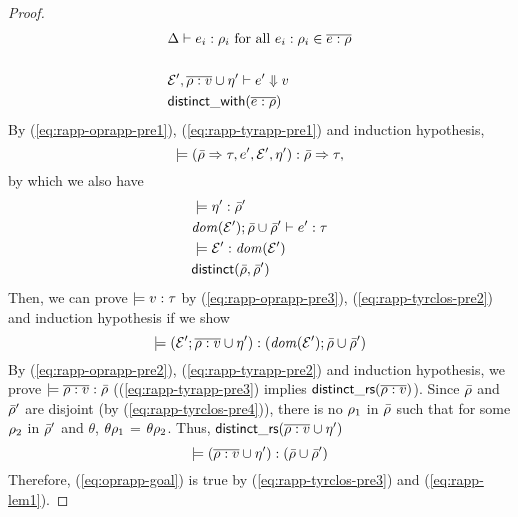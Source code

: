 \begin{proof}
\begin{align}
    \label{eq:rapp-tyrapp-pre2}
    & \Delta \vdash e_i:\rho_i \text{~for all~}
    e_i:\rho_i \in \overline{e:\rho} \\ \nonumber \\
    \label{eq:rapp-oprapp-pre3}
    & \mathcal{E}', \overline{\rho:v} \cup \eta' \vdash e' \Downarrow v \\
    \label{eq:rapp-tyrapp-pre3}
    & {\sf distinct\_with}(\overline{e:\rho})
  \end{align}
  By (\ref{eq:rapp-oprapp-pre1}), (\ref{eq:rapp-tyrapp-pre1}) and induction
  hypothesis,
  \begin{equation*}
    \models (\bar{\rho} \Rightarrow \tau, e', \mathcal{E}', \eta'):\bar{\rho} \Rightarrow \tau,
  \end{equation*}
  by which we also have
  \begin{align}
    \label{eq:rapp-tyrclos-pre1}
    & \models \eta':\bar{\rho}' \\
    \label{eq:rapp-tyrclos-pre2}
    & {\it dom }(\mathcal{E}'); \bar{\rho} \cup \bar{\rho}' 
    \vdash e':\tau \\
    \label{eq:rapp-tyrclos-pre3}
    & \models \mathcal{E}':{\it dom }(\mathcal{E}') \\
    \label{eq:rapp-tyrclos-pre4}
    & {\sf distinct}(\bar{\rho}, \bar{\rho}')
  \end{align}
  Then, we can prove $\models v:\tau$ by
  (\ref{eq:rapp-oprapp-pre3}), (\ref{eq:rapp-tyrclos-pre2}) and induction
  hypothesis if we show
  \begin{equation}
    \label{eq:oprapp-goal}
    \models (\mathcal{E}'; \overline{\rho:v} \cup \eta'):({\it dom }(\mathcal{E}'); \bar{\rho} \cup \bar{\rho}')
  \end{equation}
  By (\ref{eq:rapp-oprapp-pre2}), (\ref{eq:rapp-tyrapp-pre2}) and
  induction hypothesis, we prove $\models
  \overline{\rho:v}:\bar{\rho}$ ((\ref{eq:rapp-tyrapp-pre3}) implies
  ${\sf distinct\_rs}(\overline{\rho:v})$). Since $\bar{\rho}$ and $\bar{\rho}'$ are
  disjoint (by (\ref{eq:rapp-tyrclos-pre4})), there is no $\rho_1$
  in $\bar{\rho}$ such that for some $\rho_2$ in $\bar{\rho}'$ and
  $\theta$, $\theta \rho_1$ = $\theta \rho_2$. Thus,
  ${\sf distinct\_rs}(\overline{\rho:v} \cup \eta')$
  \begin{equation}
    \models (\overline{\rho:v} \cup \eta'):(\bar{\rho} \cup \bar{\rho}')\label{eq:rapp-lem1}
  \end{equation}
  Therefore, (\ref{eq:oprapp-goal}) is true by
  (\ref{eq:rapp-tyrclos-pre3}) and (\ref{eq:rapp-lem1}).
  
\end{proof}

